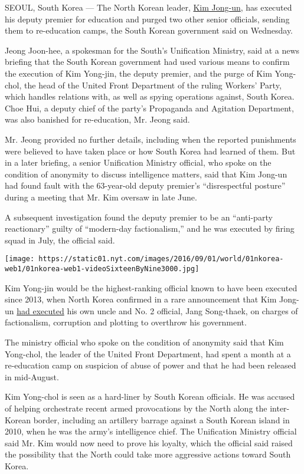 SEOUL, South Korea --- The North Korean leader,
\href{http://topics.nytimes.com/top/reference/timestopics/people/k/kim_jongun/index.html?inline=nyt-per}{Kim
Jong-un}, has executed his deputy premier for education and purged two
other senior officials, sending them to re-education camps, the South
Korean government said on Wednesday.

Jeong Joon-hee, a spokesman for the South's Unification Ministry, said
at a news briefing that the South Korean government had used various
means to confirm the execution of Kim Yong-jin, the deputy premier, and
the purge of Kim Yong-chol, the head of the United Front Department of
the ruling Workers' Party, which handles relations with, as well as
spying operations against, South Korea. Choe Hui, a deputy chief of the
party's Propaganda and Agitation Department, was also banished for
re-education, Mr. Jeong said.

Mr. Jeong provided no further details, including when the reported
punishments were believed to have taken place or how South Korea had
learned of them. But in a later briefing, a senior Unification Ministry
official, who spoke on the condition of anonymity to discuss
intelligence matters, said that Kim Jong-un had found fault with the
63-year-old deputy premier's ``disrespectful posture'' during a meeting
that Mr. Kim oversaw in late June.

A subsequent investigation found the deputy premier to be an
``anti-party reactionary'' guilty of ``modern-day factionalism,'' and he
was executed by firing squad in July, the official said.

\texttt{[image: https://static01.nyt.com/images/2016/09/01/world/01nkorea-web1/01nkorea-web1-videoSixteenByNine3000.jpg]}

Kim Yong-jin would be the highest-ranking official known to have been
executed since 2013, when North Korea confirmed in a rare announcement
that Kim Jong-un
\href{http://www.nytimes.com/2013/12/13/world/asia/north-korea-says-uncle-of-executed.html}{had
executed} his own uncle and No. 2 official, Jang Song-thaek, on charges
of factionalism, corruption and plotting to overthrow his government.

The ministry official who spoke on the condition of anonymity said that
Kim Yong-chol, the leader of the United Front Department, had spent a
month at a re-education camp on suspicion of abuse of power and that he
had been released in mid-August.

Kim Yong-chol is seen as a hard-liner by South Korean officials. He was
accused of helping orchestrate recent armed provocations by the North
along the inter-Korean border, including an artillery barrage against a
South Korean island in 2010, when he was the army's intelligence chief.
The Unification Ministry official said Mr. Kim would now need to prove
his loyalty, which the official said raised the possibility that the
North could take more aggressive actions toward South Korea.

